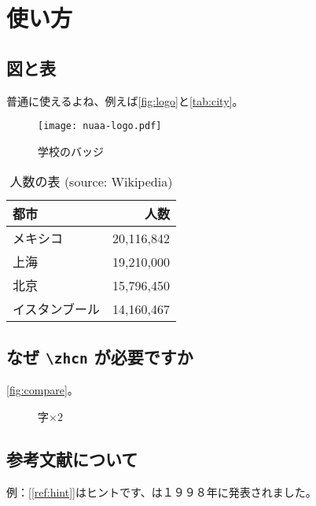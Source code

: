 \chapter{使い方}

\section{図と表}

普通に使えるよね、例えば\autoref{fig:logo}と\autoref{tab:city}。

\begin{figure}[H]
  \texttt{[image: nuaa-logo.pdf]}
  \caption[バッジ]{学校のバッジ\label{fig:logo}}
\end{figure}

\begin{table}[htb]
  \caption[人数の表]{人数の表 (source: Wikipedia)\label{tab:city}}
  \begin{tabular}{lr}
    \toprule
    都市 & 人数 \\
    \midrule
    メキシコ & 20,116,842\\
    上海 & 19,210,000\\
    北京 & 15,796,450\\
    イスタンブール & 14,160,467\\
    \bottomrule
  \end{tabular}
\end{table}

\section{なぜ \texttt{\textbackslash zhcn} が必要ですか}

\autoref{fig:compare}。

\begin{figure}[H]
  \hfil
  \quad
  \caption{字$\times 2$\label{fig:compare}}
\end{figure}


\section{参考文献について}


例：[\ref{ref:hint}]はヒントです、は１９９８年に発表されました。
